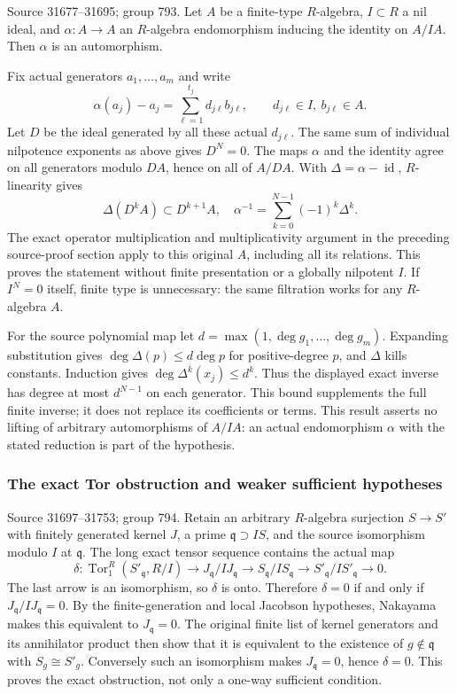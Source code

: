 Source 31677--31695; group 793. Let \(A\) be a finite-type \(R\)-algebra, \(I\subset R\) a nil ideal, and \(\alpha:A\to A\) an \(R\)-algebra endomorphism inducing the identity on \(A/IA\). Then \(\alpha\) is an automorphism.

Fix actual generators \(a_1,\ldots,a_m\) and write \[
\alpha(a_j)-a_j=\sum_{\ell=1}^{t_j}d_{j\ell}b_{j\ell},\qquad
d_{j\ell}\in I,\ b_{j\ell}\in A.
\] Let \(D\) be the ideal generated by all these actual \(d_{j\ell}\). The same sum of individual nilpotence exponents as above gives \(D^N=0\). The maps \(\alpha\) and the identity agree on all generators modulo \(DA\), hence on all of \(A/DA\). With \(\Delta=\alpha-\operatorname{id}\), \(R\)-linearity gives \[
\Delta(D^kA)\subset D^{k+1}A,\quad
\alpha^{-1}=\sum_{k=0}^{N-1}(-1)^k\Delta^k.
\] The exact operator multiplication and multiplicativity argument in the preceding source-proof section apply to this original \(A\), including all its relations. This proves the statement without finite presentation or a globally nilpotent \(I\). If \(I^N=0\) itself, finite type is unnecessary: the same filtration works for any \(R\)-algebra \(A\).

For the source polynomial map let \(d=\max(1,\deg g_1,\ldots,\deg g_m)\). Expanding substitution gives \(\deg\Delta(p)\le d\deg p\) for positive-degree \(p\), and \(\Delta\) kills constants. Induction gives \(\deg\Delta^k(x_j)\le d^k\). Thus the displayed exact inverse has degree at most \(d^{N-1}\) on each generator. This bound supplements the full finite inverse; it does not replace its coefficients or terms. This result asserts no lifting of arbitrary automorphisms of \(A/IA\): an actual endomorphism \(\alpha\) with the stated reduction is part of the hypothesis.

\subsubsection{The exact Tor obstruction and weaker sufficient hypotheses}\label{the-exact-tor-obstruction-and-weaker-sufficient-hypotheses}

Source 31697--31753; group 794. Retain an arbitrary \(R\)-algebra surjection \(S\to S'\) with finitely generated kernel \(J\), a prime \(\mathfrak q\supset IS\), and the source isomorphism modulo \(I\) at \(\mathfrak q\). The long exact tensor sequence contains the actual map \[
\delta:\operatorname{Tor}_1^R(S'_{\mathfrak q},R/I)
\longrightarrow J_{\mathfrak q}/IJ_{\mathfrak q}
\longrightarrow S_{\mathfrak q}/IS_{\mathfrak q}
\longrightarrow S'_{\mathfrak q}/IS'_{\mathfrak q}\longrightarrow0.
\] The last arrow is an isomorphism, so \(\delta\) is onto. Therefore \(\delta=0\) if and only if \(J_{\mathfrak q}/IJ_{\mathfrak q}=0\). By the finite-generation and local Jacobson hypotheses, Nakayama makes this equivalent to \(J_{\mathfrak q}=0\). The original finite list of kernel generators and its annihilator product then show that it is equivalent to the existence of \(g\notin\mathfrak q\) with \(S_g\cong S'_g\). Conversely such an isomorphism makes \(J_{\mathfrak q}=0\), hence \(\delta=0\). This proves the exact obstruction, not only a one-way sufficient condition.

